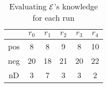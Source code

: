 \begin{table}[hc]
\centering
$ \qquad \qquad \qquad$
\\
\begin{tabular}{| c | c c c c c |}
 \hline
 & $r_0$ & $r_1$ & $r_2$ & $r_3$ & $r_4$ \\
 \hline
 pos & 8  & 8  & 9  & 8  & 10 \\
 neg & 20  & 18  & 21  & 20  & 22 \\
 nD & 3  & 7  & 3  & 3  & 2 \\
 \hline
\end{tabular}
\caption{Evaluating $\cal E$'s knowledge for each run}
\end{table}
